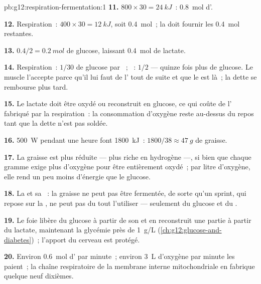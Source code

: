 \begin{solution}{pb:g12:respiration-fermentation:1}
\textbf{11.} $800 \times 30 = \qty{24}{kJ}$~: \qty{0.8}{mol} d'.

\textbf{12.} Respiration~: $400 \times 30 = \qty{12}{kJ}$, soit
\qty{0.4}{mol}~; la  doit fournir les \qty{0.4}{mol}
restantes.

\textbf{13.} $0.4/2 = \qty{0.2}{mol}$ de glucose, laissant
\qty{0.4}{mol} de lactate.

\textbf{14.} Respiration~: $1/30$ de glucose par ~; ~:
$1/2$ --- quinze fois plus de glucose. Le muscle l'accepte parce qu'il
lui faut de l' tout de suite et que le  est là~; la dette
se rembourse plus tard.

\textbf{15.} Le lactate doit être oxydé ou reconstruit en glucose, ce
qui coûte de l' fabriqué par la respiration~: la consommation
d'oxygène reste au-dessus du repos tant que la dette n'est pas
soldée.

\textbf{16.} \qty{500}{W} pendant une heure font \qty{1800}{kJ}~: $1800/38
\approx \qty{47}{g}$ de graisse.

\textbf{17.} La graisse est plus réduite --- plus riche en
hydrogène ---, si bien que chaque gramme exige plus d'oxygène pour
être entièrement oxydé~; par litre d'oxygène, elle rend un peu moins
d'énergie que le glucose.

\textbf{18.} La  et sa ~: la graisse ne peut pas
être fermentée, de sorte qu'un sprint, qui repose sur la ,
ne peut pas du tout l'utiliser --- seulement du glucose et du
.

\textbf{19.} Le foie libère du glucose à partir de son  et en
reconstruit une partie à partir du lactate, maintenant la glycémie
près de \qty{1}{g/L} (\cref{ch:g12:glucose-and-diabetes})~; l'apport
du cerveau est protégé.

\textbf{20.} Environ \qty{0.6}{mol} d' par minute~; environ
\qty{3}{L} d'oxygène par minute les paient~; la chaîne respiratoire de
la membrane interne mitochondriale en fabrique quelque neuf dixièmes.
\end{solution}
